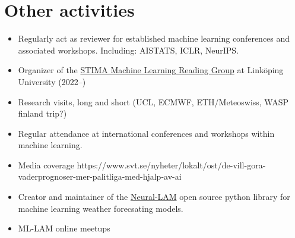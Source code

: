 \documentclass[12pt]{article}
\newcommand{\inputsection}[1]{}
\begin{document}
\inputsection{header}
\inputsection{research_interests}
\inputsection{education}
\inputsection{employment}
\inputsection{presentations}
\inputsection{reviewing}
\inputsection{event_participation}

\section*{Other activities}
\begin{itemize}
    \item Regularly act as reviewer for established machine learning conferences and associated workshops. Including:
        AISTATS,
        ICLR,
        NeurIPS.
    \item Organizer of the \href{https://github.com/STIMALiU/ml-reading-group}{STIMA Machine Learning Reading Group} at Linköping University (2022--)
    \item Research visits, long and short (UCL, ECMWF, ETH/Meteoswiss, WASP finland trip?)
    \item Regular attendance at international conferences and workshops within machine learning.
    \item Media coverage https://www.svt.se/nyheter/lokalt/ost/de-vill-gora-vaderprognoser-mer-palitliga-med-hjalp-av-ai
    \item Creator and maintainer of the \href{https://github.com/mllam/neural-lam}{Neural-LAM} open source python library for machine learning weather forecsating models.
    \item ML-LAM online meetups
\end{itemize}
\end{document}
